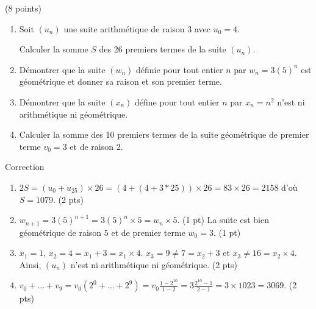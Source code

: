 \documentclass[a4paper,11pt]{article}
\theoremstyle{break}
\begin{document}
   \begin{exo}(8 points)
   ~
      \vspace{0.25cm}
   
  
  \begin{enumerate}
   \item Soit $(u_n)$ une suite arithmétique de raison 3 avec $u_0=4$.
   
   Calculer la somme $S$ des 26 premiers termes de la suite $(u_n)$. 
   
   \item Démontrer que la suite $(w_n)$ définie pour tout entier $n$ par $w_n=3(5)^n$ est géométrique
   et donner sa raison et son premier terme. 
   
   \item Démontrer que la suite $(x_n)$ défine pour tout entier $n$ par $x_n=n^2$ n'est ni
   arithmétique ni géométrique.
   
   \item Calculer la somme des 10 premiers termes de la suite géométrique de premier terme $v_0=3$ et de raison $2$.
  \end{enumerate}

\begin{correction}

Correction
\begin{enumerate}
 \item $2S=(u_0+u_{25})\times 26=(4+(4+3*25))\times 26=83 \times 26=2158$ d'o\`u $S=1079$. (2 pts)
 \item $w_{n+1}=3(5)^{n+1}=3(5)^n\times 5=w_n \times 5$. (1 pt)
 La suite est bien g\'eom\'etrique de raison $5$ 
 et de premier terme $w_0=3$. (1 pt)
 \item $x_1=1$, $x_2=4=x_1+3=x_1 \times 4$. 
 $x_3=9 \neq 7=x_2+3$ et $x_3 \neq 16 = x_2 \times 4$. Ainsi, $(u_n)$ n'est ni arithm\'etique ni 
 g\'eom\'etrique. (2 pts)
 
 \item $v_{0}+...+v_9=v_0({2}^{0}+...+{2}^{9})=v_0 \frac{1-{2}^{10}}{1-2}=3\frac{{2}^{10}-1}{2-1}=3\times 1023=3069$. (2 pts)
\end{enumerate}

\end{correction}
  \end{exo}
    
     ~
  \vspace{0.5cm}
  
\end{document}
